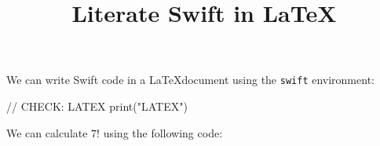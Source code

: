 \usepackage{listings}
\usepackage{color}


\title{Literate Swift in \LaTeX}



We can write Swift code in a \LaTeX document using the \texttt{swift}
environment:

\begin{swift}
  // CHECK: LATEX
  print("LATEX")
\end{swift}

We can calculate $7!$ using the following code:



